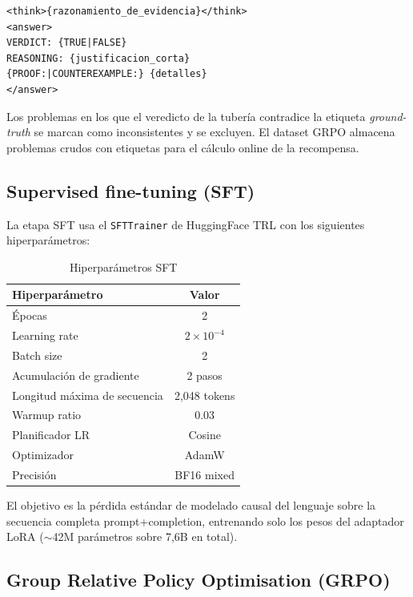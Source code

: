 \documentclass{article}
\begin{document}
\begin{verbatim}
<think>{razonamiento_de_evidencia}</think>
<answer>
VERDICT: {TRUE|FALSE}
REASONING: {justificacion_corta}
{PROOF:|COUNTEREXAMPLE:} {detalles}
</answer>
\end{verbatim}

Los problemas en los que el veredicto de la tuber\'ia contradice la etiqueta \textit{ground-truth} se marcan como inconsistentes y se excluyen. El dataset GRPO almacena problemas crudos con etiquetas para el c\'alculo online de la recompensa.

\subsection{Supervised fine-tuning (SFT)}
\label{sec:sft}

La etapa SFT usa el \texttt{SFTTrainer} de HuggingFace TRL con los siguientes hiperpar\'ametros:

\begin{table}[h]
  \caption{Hiperpar\'ametros SFT}
  \label{tab:sft}
  \centering
  \begin{tabular}{lc}
    \toprule
    Hiperpar\'ametro & Valor \\
    \midrule
    \'Epocas & 2 \\
    Learning rate & $2 \times 10^{-4}$ \\
    Batch size & 2 \\
    Acumulaci\'on de gradiente & 2 pasos \\
    Longitud m\'axima de secuencia & 2{,}048 tokens \\
    Warmup ratio & 0.03 \\
    Planificador LR & Cosine \\
    Optimizador & AdamW \\
    Precisi\'on & BF16 mixed \\
    \bottomrule
  \end{tabular}
\end{table}

El objetivo es la p\'erdida est\'andar de modelado causal del lenguaje sobre la secuencia completa prompt+completion, entrenando solo los pesos del adaptador LoRA ($\sim$42M par\'ametros sobre 7{,}6B en total).

\subsection{Group Relative Policy Optimisation (GRPO)}
\label{sec:grpo}
\end{document}
